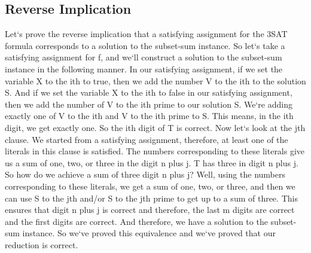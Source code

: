 \subsection{Reverse Implication}
Let`s prove the reverse implication that a satisfying assignment for the 3SAT formula corresponds to a solution to the subset-sum instance.
So let`s take a satisfying assignment for f, and we`ll construct a solution to the subset-sum instance in the following manner.
In our satisfying assignment, if we set the variable X to the ith to true, then we add the number V to the ith to the solution S\@.
And if we set the variable X to the ith to false in our satisfying assignment, then we add the number of V to the ith prime to our solution S\@.
We`re adding exactly one of V to the ith and V to the ith prime to S\@.
This means, in the ith digit, we get exactly one.
So the ith digit of T is correct.
Now let`s look at the jth clause.
We started from a satisfying assignment, therefore, at least one of the literals in this clause is satisfied.
The numbers corresponding to these literals give us a sum of one, two, or three in the digit n plus j.
T has three in digit n plus j.
So how do we achieve a sum of three digit n plus j? Well, using the numbers corresponding to these literals, we get a sum of one, two, or three, and then we can use S to the jth and/or S to the jth prime to get up to a sum of three.
This ensures that digit n plus j is correct and therefore, the last m digits are correct and the first digits are correct.
And therefore, we have a solution to the subset-sum instance.
So we`ve proved this equivalence and we`ve proved that our reduction is correct.

